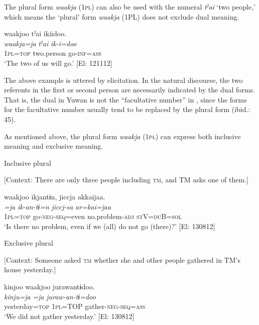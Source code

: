 The plural form \textit{waakja} (1\textsc{pl}) can also be used with the numeral \textit{tˀai} ‘two people,’ which means the ‘plural’ form \textit{waakja} (1PL) does not exclude dual meaning.

\ea \label{ex:5:6}   %
\glll  waakjoo  tˀai  ikiidoo.\\
\textit{waakja=ja}  \textit{tˀai}  \textit{ik-i=doo}\\
1\textsc{pl}=\textsc{top}  two.person  go-\textsc{inf}=\textsc{ass}\\
\glt ‘The two of us will go.’ [El: 121112]
\z

The above example is uttered by elicitation. In the natural discourse, the two referents in the first or second person are necessarily indicated by the dual forms. That is, the dual in Yuwan is not the “facultative number” in \citet{Corbett2000}, since the forms for the facultative number usually tend to be replaced by the plural form (ibid.: 45).

As mentioned above, the plural form \textit{waakja} (1\textsc{pl}) can express both inclusive meaning and exclusive meaning.

\ea \label{ex:5:7}  \ea \label{ex:5:7a} Inclusive plural

    [Context: There are only three people including \textsc{tm}, and TM asks one of them.]

\glll  waakjoo  ikjantɨn,  jiccja  akkaijaa.\\
\textit{=ja}  \textit{ik-an-tɨ=n}  \textit{jiccj-sa}  \textit{ar=kai=jaa}\\
1\textsc{pl}=\textsc{top}  go-\textsc{neg}-\textsc{seq}=even  no.problem-\textsc{adj}  \textsc{st}V=\textsc{du}B=\textsc{sol}\\
\glt ‘Is there no problem, even if we (all) do not go (there)?’ [El: 130812]

 \ex \label{ex:5:b} Exclusive plural

    [Context: Someone asked \textsc{tm} whether she and other people gathered in TM’s house yesterday.]

\glll  kinjoo  waakjoo  jurawantɨdoo.\\
\textit{kinju=ja}  \textit{=ja}  \textit{juraw-an-tɨ=doo}\\
yesterday=\textsc{top}  1\textsc{pl}=TOP  gather-\textsc{neg}-\textsc{seq}=\textsc{ass}\\
\glt ‘We did not gather yesterday.’ [El: 130812]
\z
\z

